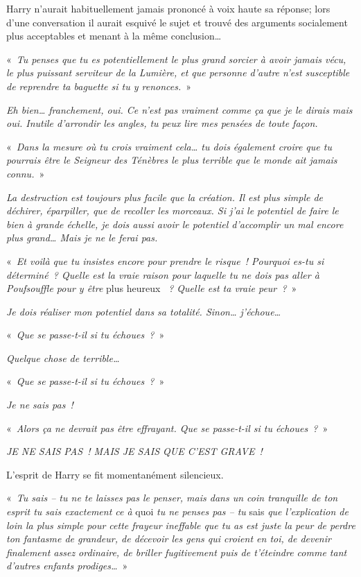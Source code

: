 Harry n'aurait habituellement jamais prononcé à voix haute sa réponse;
lors d'une conversation il aurait esquivé le sujet et trouvé des arguments socialement plus acceptables et menant à la même conclusion…

«~\emph{Tu penses que tu es potentiellement le plus grand sorcier à avoir jamais vécu, le plus puissant serviteur de la Lumière, et que personne d'autre n'est susceptible de reprendre ta baguette si tu y renonces.}~»

\emph{Eh bien… franchement, oui.
Ce n'est pas vraiment comme ça que je le dirais mais oui.
Inutile d'arrondir les angles, tu peux lire mes pensées de toute façon.}

«~\emph{Dans la mesure où tu crois vraiment cela… tu dois également croire que tu pourrais être le Seigneur des Ténèbres le plus terrible que le monde ait jamais connu.}~»

\emph{La destruction est toujours plus facile que la création.
Il est plus simple de déchirer, éparpiller, que de recoller les morceaux.
Si j'ai le potentiel de faire le bien à grande échelle, je dois aussi avoir le potentiel d'accomplir un mal encore plus grand…
Mais je ne le ferai pas.}

«~\emph{Et voilà que tu insistes encore pour prendre le risque~!
Pourquoi es-tu si déterminé~?
Quelle est la vraie raison pour laquelle tu ne dois pas aller à Poufsouffle pour y être} plus heureux \emph{~? Quelle est ta vraie peur~?}~»

\emph{Je dois réaliser mon potentiel dans sa totalité. Sinon… j'échoue…}

«~\emph{Que se passe-t-il si tu échoues~?}~»

\emph{Quelque chose de terrible…}

«~\emph{Que se passe-t-il si tu échoues~?}~»

\emph{Je ne sais pas~!}

«~\emph{Alors ça ne devrait pas être effrayant. Que se passe-t-il si tu échoues~?}~»

\emph{JE NE SAIS PAS~! MAIS JE SAIS QUE C'EST GRAVE~!}

L'esprit de Harry se fit momentanément silencieux.

«~\emph{Tu sais -- tu ne te laisses pas le penser, mais dans un coin tranquille de ton esprit tu sais exactement ce à} quoi \emph{tu ne penses pas -- tu} sais \emph{que l'explication de loin la plus simple pour cette frayeur ineffable que tu as est juste la peur de perdre ton fantasme de grandeur, de décevoir les gens qui croient en toi, de devenir finalement assez ordinaire, de briller fugitivement puis de t'éteindre comme tant d'autres enfants prodiges…}~»

